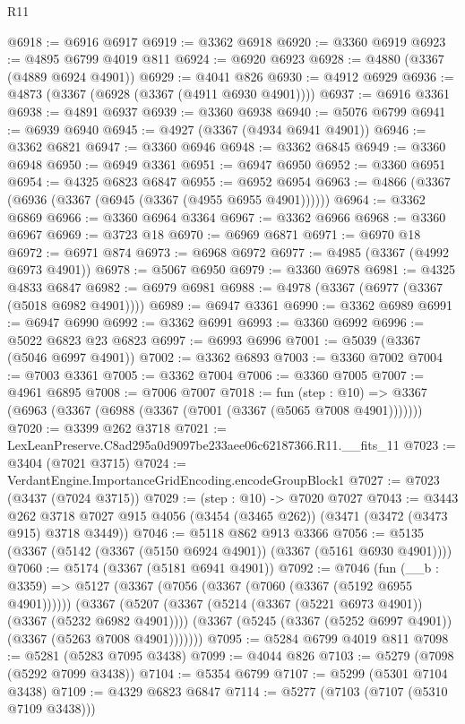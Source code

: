 \begin{lexlean}{R11}
\begin{coremodule}
@6918 := @6916 @6917
@6919 := @3362 @6918
@6920 := @3360 @6919
@6923 := @4895 @6799 @4019 @811
@6924 := @6920 @6923
@6928 := @4880 (@3367 (@4889 @6924 @4901))
@6929 := @4041 @826
@6930 := @4912 @6929
@6936 := @4873 (@3367 (@6928 (@3367 (@4911 @6930 @4901))))
@6937 := @6916 @3361
@6938 := @4891 @6937
@6939 := @3360 @6938
@6940 := @5076 @6799
@6941 := @6939 @6940
@6945 := @4927 (@3367 (@4934 @6941 @4901))
@6946 := @3362 @6821
@6947 := @3360 @6946
@6948 := @3362 @6845
@6949 := @3360 @6948
@6950 := @6949 @3361
@6951 := @6947 @6950
@6952 := @3360 @6951
@6954 := @4325 @6823 @6847
@6955 := @6952 @6954
@6963 := @4866 (@3367 (@6936 (@3367 (@6945 (@3367 (@4955 @6955 @4901))))))
@6964 := @3362 @6869
@6966 := @3360 @6964 @3364
@6967 := @3362 @6966
@6968 := @3360 @6967
@6969 := @3723 @18
@6970 := @6969 @6871
@6971 := @6970 @18
@6972 := @6971 @874
@6973 := @6968 @6972
@6977 := @4985 (@3367 (@4992 @6973 @4901))
@6978 := @5067 @6950
@6979 := @3360 @6978
@6981 := @4325 @4833 @6847
@6982 := @6979 @6981
@6988 := @4978 (@3367 (@6977 (@3367 (@5018 @6982 @4901))))
@6989 := @6947 @3361
@6990 := @3362 @6989
@6991 := @6947 @6990
@6992 := @3362 @6991
@6993 := @3360 @6992
@6996 := @5022 @6823 @23 @6823
@6997 := @6993 @6996
@7001 := @5039 (@3367 (@5046 @6997 @4901))
@7002 := @3362 @6893
@7003 := @3360 @7002
@7004 := @7003 @3361
@7005 := @3362 @7004
@7006 := @3360 @7005
@7007 := @4961 @6895
@7008 := @7006 @7007
@7018 := fun (step : @10) =>
  @3367 (@6963 (@3367 (@6988 (@3367 (@7001 (@3367 (@5065 @7008 @4901)))))))
@7020 := @3399 @262 @3718
@7021 := LexLeanPreserve.C8ad295a0d9097be233aee06c62187366.R11.__fits_11
@7023 := @3404 (@7021 @3715)
@7024 := VerdantEngine.ImportanceGridEncoding.encodeGroupBlock1
@7027 := @7023 (@3437 (@7024 @3715))
@7029 := (step : @10) -> @7020 @7027
@7043 := @3443
    @262
    @3718
    @7027
    @915
    @4056
    (@3454 (@3465 @262))
    (@3471 (@3472 (@3473 @915) @3718 @3449))
@7046 := @5118 @862 @913 @3366
@7056 := @5135 (@3367 (@5142 (@3367 (@5150 @6924 @4901)) (@3367 (@5161 @6930 @4901))))
@7060 := @5174 (@3367 (@5181 @6941 @4901))
@7092 := @7046
    (fun (__b : @3359) =>
    @5127
      (@3367 (@7056 (@3367 (@7060 (@3367 (@5192 @6955 @4901))))))
      (@3367
        (@5207
          (@3367 (@5214 (@3367 (@5221 @6973 @4901)) (@3367 (@5232 @6982 @4901))))
          (@3367 (@5245 (@3367 (@5252 @6997 @4901)) (@3367 (@5263 @7008 @4901)))))))
@7095 := @5284 @6799 @4019 @811
@7098 := @5281 (@5283 @7095 @3438)
@7099 := @4044 @826
@7103 := @5279 (@7098 (@5292 @7099 @3438))
@7104 := @5354 @6799
@7107 := @5299 (@5301 @7104 @3438)
@7109 := @4329 @6823 @6847
@7114 := @5277 (@7103 (@7107 (@5310 @7109 @3438)))

\end{coremodule}
\end{lexlean}
